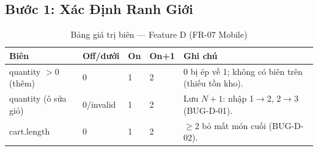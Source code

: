 \documentclass[12pt, a4paper]{report}
\begin{document}
\subsection{Bước 1: Xác Định Ranh Giới}
\begin{table}[H]
    \centering
    \caption{Bảng giá trị biên — Feature D (FR-07 Mobile)}
    \begin{tabularx}{\linewidth}{L{3.4cm} C{1.8cm} C{1.8cm} C{1.8cm} X}
        \toprule
        \textbf{Biên} & \textbf{Off/dưới} & \textbf{On} & \textbf{On+1} & \textbf{Ghi chú} \\
        \midrule
        quantity $>0$ (thêm) & 0 & 1 & 2 & 0 bị ép về 1; không có biên trên (thiếu tồn kho). \\
        quantity (ô sửa giỏ) & 0/invalid & 1 & 2 & Lưu $N+1$: nhập 1$\to$2, 2$\to$3 (BUG-D-01). \\
        cart.length & 0 & 1 & 2 & $\ge 2$ bỏ mất món cuối (BUG-D-02). \\
        \bottomrule
    \end{tabularx}
\end{table}
\end{document}
